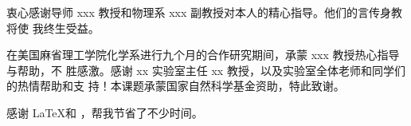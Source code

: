 \begin{acknowledgement}
  衷心感谢导师 xxx 教授和物理系 xxx 副教授对本人的精心指导。他们的言传身教将使
  我终生受益。

  在美国麻省理工学院化学系进行九个月的合作研究期间，承蒙 xxx 教授热心指导与帮助，不
  胜感激。感谢 xx 实验室主任 xx 教授，以及实验室全体老师和同学们的热情帮助和支
  持！本课题承蒙国家自然科学基金资助，特此致谢。

  感谢 \LaTeX 和 \thuthesis\cite{thuthesis}，帮我节省了不少时间。
\end{acknowledgement}
